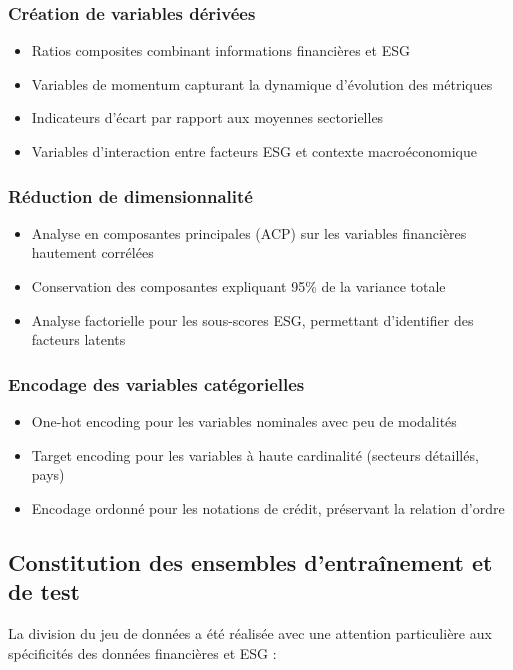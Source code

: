 \subsubsection{Création de variables dérivées}
\begin{itemize}
  \item Ratios composites combinant informations financières et ESG
  \item Variables de momentum capturant la dynamique d'évolution des métriques
  \item Indicateurs d'écart par rapport aux moyennes sectorielles
  \item Variables d'interaction entre facteurs ESG et contexte macroéconomique
\end{itemize}

\subsubsection{Réduction de dimensionnalité}
\begin{itemize}
  \item Analyse en composantes principales (ACP) sur les variables financières hautement corrélées
  \item Conservation des composantes expliquant 95\% de la variance totale
  \item Analyse factorielle pour les sous-scores ESG, permettant d'identifier des facteurs latents
\end{itemize}

\subsubsection{Encodage des variables catégorielles}
\begin{itemize}
  \item One-hot encoding pour les variables nominales avec peu de modalités
  \item Target encoding pour les variables à haute cardinalité (secteurs détaillés, pays)
  \item Encodage ordonné pour les notations de crédit, préservant la relation d'ordre
\end{itemize}

\subsection{Constitution des ensembles d'entraînement et de test}

La division du jeu de données a été réalisée avec une attention particulière aux spécificités des données financières et ESG :

